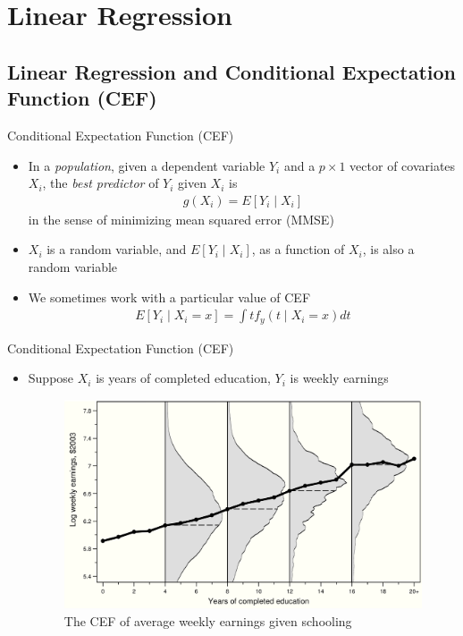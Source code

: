\documentclass[aspectratio=1610,12pt,xcolor=dvipsnames]{beamer}
\begin{document}
\section{Linear Regression}

\subsection*{Linear Regression and Conditional Expectation Function (CEF)}

\begin{frame}
  \subsectionpage
\end{frame}

\begin{frame}{Conditional Expectation Function (CEF)}
    \begin{itemize}
        \item In a \textit{population}, given a dependent variable $Y_i$ and a $p \times 1$ vector of covariates $X_i$, the \textit{best predictor} of $Y_i$ given $X_i$ is
        \begin{align*}
            g(X_i) = E[Y_i \mid X_i]
        \end{align*}
        in the sense of minimizing mean squared error (MMSE)
        \item $X_i$ is a random variable, and $E[Y_i \mid X_i]$, as a function of $X_i$, is also a random variable
        \item We sometimes work with a particular value of CEF
        \begin{align*}
            E[Y_i \mid X_i = x] = \int tf_y(t \mid X_i = x)dt
        \end{align*}
    \end{itemize}
\end{frame}

\begin{frame}{Conditional Expectation Function (CEF)}
    \begin{itemize}
        \item Suppose $X_i$ is years of completed education, $Y_i$ is weekly earnings
        \begin{figure}
            \centering
            \includegraphics[width=0.7\linewidth]{./Figures/CEF_education.png}
            \caption{The CEF of average weekly earnings given schooling}
            \label{fig:CEF_education}
        \end{figure}
    \end{itemize}
\end{frame}
\end{document}

